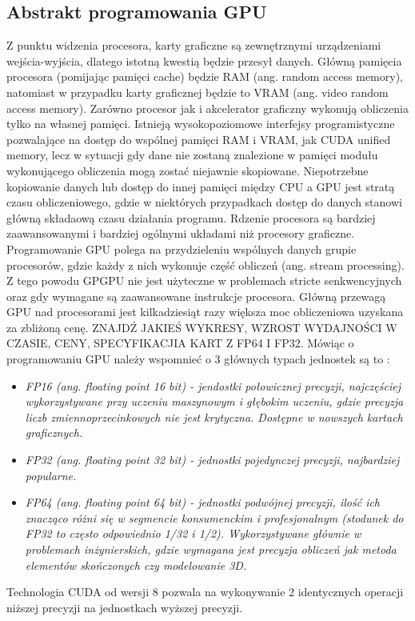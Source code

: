 \subsection{Abstrakt programowania GPU}
Z punktu widzenia procesora, karty graficzne są zewnętrznymi urządzeniami wejścia-wyjścia, dlatego istotną kwestią będzie przesył danych. Główną pamięcia procesora (pomijając pamięci cache) będzie RAM (ang. random access memory), natomiast w przypadku karty graficznej będzie to VRAM (ang. video random access memory). Zarówno procesor jak i akcelerator graficzny wykonują obliczenia tylko na własnej pamięci. Istnieją wysokopoziomowe interfejsy programistyczne pozwalające na dostęp do wspólnej pamięci RAM i VRAM, jak CUDA unified memory, lecz w sytuacji gdy dane nie zostaną znalezione w pamięci modułu wykonującego obliczenia mogą zostać niejawnie skopiowane. Niepotrzebne kopiowanie danych lub dostęp do innej pamięci między CPU a GPU jest stratą czasu obliczeniowego, gdzie w niektórych przypadkach dostęp do danych stanowi główną składaową czasu działania programu. Rdzenie procesora są bardziej zaawansowanymi i bardziej ogólnymi układami niż procesory graficzne. Programowanie GPU polega na przydzieleniu wspólnych danych grupie procesorów, gdzie każdy z nich wykonuje część obliczeń (ang. stream processing). Z tego powodu GPGPU nie jest użyteczne w problemach stricte senkwencyjnych oraz gdy wymagane są zaawansowane instrukcje procesora. Główną przewagą GPU nad procesorami jest kilkadziesiąt razy większa moc obliczeniowa uzyskana za zbliżoną cenę. ZNAJDŹ JAKIEŚ WYKRESY, WZROST WYDAJNOŚCI W CZASIE, CENY, SPECYFIKACJIA KART Z FP64 I FP32. Mówiąc o programowaniu GPU należy wspomnieć o 3 głównych typach jednostek są to :
\begin{itemize}
	\item \it{FP16} (ang. floating point 16 bit) - jendostki połowicznej precyzji, najczęściej wykorzystywane przy uczeniu maszynowym i głębokim uczeniu, gdzie precyzja liczb zmiennoprzecinkowych nie jest krytyczna. Dostępne w nowszych kartach graficznych.
	\item \it{FP32} (ang. floating point 32 bit) - jednostki pojedynczej precyzji, najbardziej popularne.
	\item \it{FP64} (ang. floating point 64 bit) - jednostki podwójnej precyzji, ilość ich znacząco różni się w segmencie konsumenckim i profesjonalnym (stodunek do FP32 to często odpowiednio 1/32 i 1/2). Wykorzystywane głównie w problemach inżynierskich, gdzie wymagana jest precyzja obliczeń jak metoda elementów skończonych czy modelowanie 3D.
\end{itemize}
Technologia CUDA od wersji 8 pozwala na wykonywanie 2 identycznych operacji niższej precyzji na jednostkach wyższej precyzji. \cite{Mix16}


